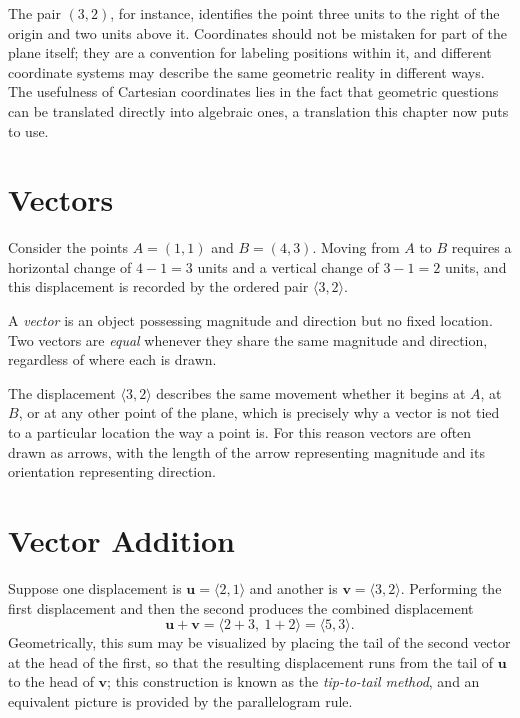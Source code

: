 The pair $(3,2)$, for instance, identifies the point three units to the
right of the origin and two units above it. Coordinates should not be
mistaken for part of the plane itself; they are a convention for labeling
positions within it, and different coordinate systems may describe the same
geometric reality in different ways. The usefulness of Cartesian coordinates
lies in the fact that geometric questions can be translated directly into
algebraic ones, a translation this chapter now puts to use.

\section{Vectors}

Consider the points $A = (1,1)$ and $B = (4,3)$. Moving from $A$ to $B$
requires a horizontal change of $4 - 1 = 3$ units and a vertical change of
$3 - 1 = 2$ units, and this displacement is recorded by the ordered pair
$\langle 3, 2 \rangle$.

\begin{definition}
A \emph{vector} is an object possessing magnitude and direction but no fixed
location. Two vectors are \emph{equal} whenever they share the same
magnitude and direction, regardless of where each is drawn.
\end{definition}

The displacement $\langle 3,2 \rangle$ describes the same movement whether
it begins at $A$, at $B$, or at any other point of the plane, which is
precisely why a vector is not tied to a particular location the way a point
is. For this reason vectors are often drawn as arrows, with the length of
the arrow representing magnitude and its orientation representing direction.

\section{Vector Addition}

Suppose one displacement is $\mathbf{u} = \langle 2,1 \rangle$ and another is
$\mathbf{v} = \langle 3,2 \rangle$. Performing the first displacement and
then the second produces the combined displacement
\[
\mathbf{u} + \mathbf{v} = \langle 2+3,\ 1+2 \rangle = \langle 5,3 \rangle.
\]
Geometrically, this sum may be visualized by placing the tail of the second
vector at the head of the first, so that the resulting displacement runs
from the tail of $\mathbf{u}$ to the head of $\mathbf{v}$; this construction
is known as the \emph{tip-to-tail method}, and an equivalent picture is
provided by the parallelogram rule.

